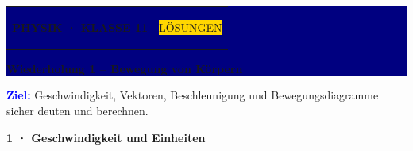 \documentclass[10pt,a4paper]{article}
\newcommand{\sectiontitle}[1]{%
  \vspace{1.0mm}%
  {\color{Blue}\bfseries\large #1}\par
  \vspace{0.3mm}{\color{Blue}\rule{\linewidth}{0.7pt}}\par
  \vspace{0.4mm}%
}
\begin{document}
\colorbox{Navy}{%
  \parbox{\dimexpr\linewidth-2\fboxsep\relax}{%
    \vspace{2.6mm}\color{white}
    \begin{tabularx}{\linewidth}{@{}Xr@{}}
      {\small\bfseries PHYSIK · KLASSE 11} &
      \colorbox{Gold}{\color{Navy}\small\bfseries\strut LÖSUNGEN}
    \end{tabularx}
    \vspace{2.1mm}
    {\fontsize{19}{22}\selectfont\bfseries Wiederholung 1 -- Bewegung von Körpern}\par
    \vspace{0.6mm}{\large Sicherungsblatt}\vspace{2.4mm}
  }%
}

\vspace{2.0mm}
\colorbox{Sky}{%
  \parbox{\dimexpr\linewidth-2\fboxsep\relax}{%
    \vspace{1.3mm}
    \textcolor{Blue}{\bfseries Ziel:}
    Geschwindigkeit, Vektoren, Beschleunigung und Bewegungsdiagramme sicher deuten und berechnen.
    \vspace{1.3mm}
  }%
}

\sectiontitle{1 · Geschwindigkeit und Einheiten}
\end{document}
